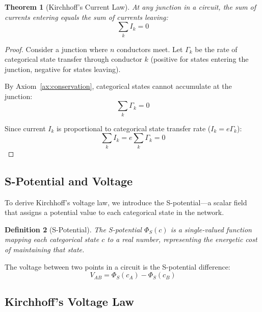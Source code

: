 \documentclass[twocolumn,showpacs,preprintnumbers,amsmath,amssymb,prd]{revtex4-2}
\newtheorem{theorem}{Theorem}[section]
\newtheorem{definition}[theorem]{Definition}
\begin{document}
\begin{theorem}[Kirchhoff's Current Law]
\label{thm:kcl}
At any junction in a circuit, the sum of currents entering equals the sum of currents leaving:
\begin{equation}
\sum_k I_k = 0
\label{eq:kcl}
\end{equation}
\end{theorem}

\begin{proof}
Consider a junction where $n$ conductors meet. Let $\Gamma_k$ be the rate of categorical state transfer through conductor $k$ (positive for states entering the junction, negative for states leaving).

By Axiom~\ref{ax:conservation}, categorical states cannot accumulate at the junction:
\begin{equation}
\sum_k \Gamma_k = 0
\label{eq:categorical_conservation}
\end{equation}

Since current $I_k$ is proportional to categorical state transfer rate ($I_k = e\Gamma_k$):
\begin{equation}
\sum_k I_k = e \sum_k \Gamma_k = 0
\end{equation}
\end{proof}

\subsection{S-Potential and Voltage}

To derive Kirchhoff's voltage law, we introduce the S-potential---a scalar field that assigns a potential value to each categorical state in the network.

\begin{definition}[S-Potential]
\label{def:s_potential}
The S-potential $\Phi_S(c)$ is a single-valued function mapping each categorical state $c$ to a real number, representing the energetic cost of maintaining that state.
\end{definition}

The voltage between two points in a circuit is the S-potential difference:
\begin{equation}
V_{AB} = \Phi_S(c_A) - \Phi_S(c_B)
\label{eq:voltage_s}
\end{equation}

\subsection{Kirchhoff's Voltage Law}
\end{document}
